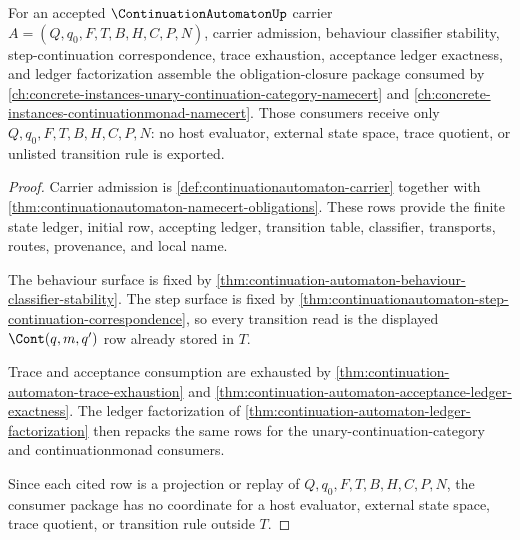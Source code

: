 \begin{theorem}\label{thm:continuation-automaton-obligation-closure-consumer-pack}
For an accepted $\ContinuationAutomatonUp$ carrier $A=(Q,q_0,F,T,B,H,C,P,N)$, carrier admission, behaviour classifier stability, step-continuation correspondence, trace exhaustion, acceptance ledger exactness, and ledger factorization assemble the obligation-closure package consumed by \autoref{ch:concrete-instances-unary-continuation-category-namecert} and \autoref{ch:concrete-instances-continuationmonad-namecert}. Those consumers receive only $Q,q_0,F,T,B,H,C,P,N$: no host evaluator, external state space, trace quotient, or unlisted transition rule is exported.
\end{theorem}
\begin{proof}
Carrier admission is \autoref{def:continuationautomaton-carrier} together with \autoref{thm:continuationautomaton-namecert-obligations}. These rows provide the finite state ledger, initial row, accepting ledger, transition table, classifier, transports, routes, provenance, and local name.

The behaviour surface is fixed by \autoref{thm:continuation-automaton-behaviour-classifier-stability}. The step surface is fixed by \autoref{thm:continuationautomaton-step-continuation-correspondence}, so every transition read is the displayed $\Cont(q,m,q')$ row already stored in $T$.

Trace and acceptance consumption are exhausted by \autoref{thm:continuation-automaton-trace-exhaustion} and \autoref{thm:continuation-automaton-acceptance-ledger-exactness}. The ledger factorization of \autoref{thm:continuation-automaton-ledger-factorization} then repacks the same rows for the unary-continuation-category and continuationmonad consumers.

Since each cited row is a projection or replay of $Q,q_0,F,T,B,H,C,P,N$, the consumer package has no coordinate for a host evaluator, external state space, trace quotient, or transition rule outside $T$.
\end{proof}

